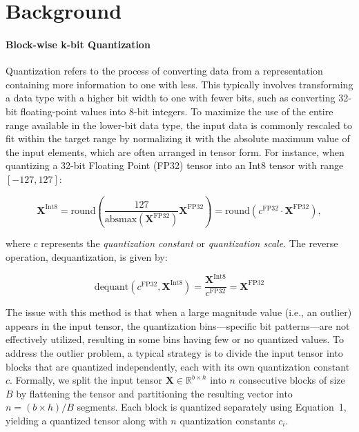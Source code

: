 \section{Background}
\paragraph{Block-wise k-bit Quantization} Quantization refers to the process of converting data from a representation containing more information to one with less. This typically involves transforming a data type with a higher bit width to one with fewer bits, such as converting 32-bit floating-point values into 8-bit integers. To maximize the use of the entire range available in the lower-bit data type, the input data is commonly rescaled to fit within the target range by normalizing it with the absolute maximum value of the input elements, which are often arranged in tensor form. For instance, when quantizing a 32-bit Floating Point (FP32) tensor into an Int8 tensor with range $[-127, 127]$:

\begin{equation}
    \mathbf{X}^{ \text{Int8}} = \text{round}\left( \frac{127}{{\text{absmax}}(\mathbf{X}^{{\text{FP32}}})}\mathbf{X}^{{\text{FP32}}} \right) = \text{round}(c^{\text{FP32}}\cdot \mathbf{X}^{{\text{FP32}}}),
\end{equation}

where $c$ represents the {\em quantization constant} or {\em quantization scale}. The reverse operation, dequantization, is given by:

\begin{equation}
    \text{dequant}(c^{\text{FP32}}, \mathbf{X}^{\text{Int8}}) = \frac{\mathbf{X}^{\text{Int8}}}{c^{\text{FP32}}} = \mathbf{X}^{\text{FP32}}
\end{equation}

The issue with this method is that when a large magnitude value (i.e., an outlier) appears in the input tensor, the quantization bins—specific bit patterns—are not effectively utilized, resulting in some bins having few or no quantized values. To address the outlier problem, a typical strategy is to divide the input tensor into blocks that are quantized independently, each with its own quantization constant $c$. Formally, we split the input tensor $\mathbf{X}\in \mathbb{R}^{b\times h}$ into $n$ consecutive blocks of size $B$ by flattening the tensor and partitioning the resulting vector into ${n = ({b\times h} )/{B} }$ segments. Each block is quantized separately using Equation~1, yielding a quantized tensor along with $n$ quantization constants $c_i$.

